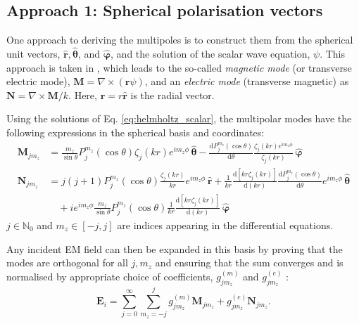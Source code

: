 \subsection{Approach 1: Spherical polarisation vectors}\label{sec:2_bohren}
One approach to deriving the multipoles is to construct them from the spherical unit vectors, \( \mathbf{\hat{r}}, \boldsymbol{\hat{\theta}} \), and \( \boldsymbol{\hat{\varphi}} \), and the solution of the scalar wave equation, \( \psi \). This approach is taken in \cite{bohren}, which leads to the so-called \textit{magnetic mode} (or transverse electric mode), \( \mathbf{M} = \nabla \times (\mathbf{r} \psi) \), and an \textit{electric mode} (transverse magnetic) as \( \mathbf{N} = \nabla \times \mathbf{M} / k \). Here, \( \mathbf{r} = r \hat{\mathbf{r}} \) is the radial vector.

Using the solutions of Eq. \ref{eq:helmholtz_scalar}, the multipolar modes have the following expressions in the spherical basis and coordinates:
\begin{align*}
\mathbf{M}_{jm_z} &= \frac{m_z}{\sin \theta} P_j^{m_z}(\cos\theta) \zeta_j(kr) e^{im_z \phi} \, \boldsymbol{\hat{\theta}} - \frac{\mathrm{d} P_j^{m_z}(\cos\theta)}{\mathrm{d} \theta} \frac{\zeta_j(kr) e^{im_z \phi}}{\zeta_j(kr)} \, \boldsymbol{\hat{\varphi}} \\
\mathbf{N}_{jm_z} &= j(j + 1) P_j^{m_z}(\cos\theta) \frac{\zeta_j(kr)}{kr} e^{im_z \phi} \, \mathbf{\hat{r}} + \frac{1}{kr} \frac{\mathrm{d} \left[ kr \zeta_j(kr) \right]}{\mathrm{d} (kr)} \frac{\mathrm{d} P_j^{m_z}(\cos\theta)}{\mathrm{d} \theta} e^{im_z \phi} \, \boldsymbol{\hat{\theta}} \\
&\quad + i e^{im_z \phi} \frac{m_z}{\sin \theta} P_j^{m_z}(\cos\theta) \frac{1}{kr} \frac{\mathrm{d} \left[ kr \zeta_j(kr) \right]}{\mathrm{d} (kr)} \, \boldsymbol{\hat{\varphi}}
\end{align*}
\( j \in \mathbb{N}_0 \) and \( m_z \in [-j, j] \) are indices appearing in the differential equations.

Any incident EM field can then be expanded in this basis by proving that the modes are orthogonal for all \( j, m_z \) and ensuring that the sum converges and is normalised by appropriate choice of coefficients, \( g^{(m)}_{jm_z} \) and \( g^{(e)}_{jm_z} \) \cite{bohren}:
\begin{equation}\label{eq:E_i_expansion}
    \mathbf{E}_i = \sum_{j=0}^\infty \sum_{m_z=-j}^j g_{jm_z}^{(m)} \mathbf{M}_{jm_z} + g_{jm_z}^{(e)} \mathbf{N}_{jm_z}.
\end{equation}

